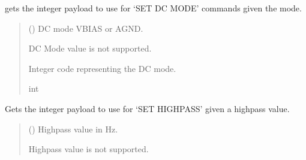 \documentclass[letterpaper,10pt,english]{sphinxmanual}
\begin{document}
\begin{fulllineitems}
\begin{fulllineitems}
\label{\detokenize{Setup_8401HR:Setup_8401HR.Setup_8401HR._CodeDCmode}}
\pysigstartsignatures
{}
\pysigstopsignatures
\sphinxAtStartPar
gets the integer payload to use for ‘SET DC MODE’ commands given the mode.
\begin{quote}\begin{description}
\sphinxAtStartPar
{} () \textendash{} DC mode VBIAS or AGND.

\sphinxAtStartPar
{} \textendash{} DC Mode value is not supported.

\sphinxAtStartPar
Integer code representing the DC mode.

\sphinxAtStartPar
int

\end{description}\end{quote}

\end{fulllineitems}


\begin{fulllineitems}
\label{\detokenize{Setup_8401HR:Setup_8401HR.Setup_8401HR._CodeHighpass}}
\pysigstartsignatures
{}
\pysigstopsignatures
\sphinxAtStartPar
Gets the integer payload to use for ‘SET HIGHPASS’ given a highpass value.
\begin{quote}\begin{description}
\sphinxAtStartPar
{} () \textendash{} Highpass value in Hz.

\sphinxAtStartPar
{} \textendash{} High\sphinxhyphen{}pass value is not supported.


\end{description}
\end{quote}
\end{fulllineitems}
\end{fulllineitems}
\end{document}
